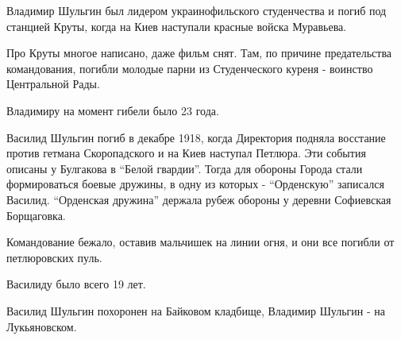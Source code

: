 
Владимир Шульгин был лидером украинофильского студенчества и погиб под станцией
Круты, когда на Киев наступали красные войска Муравьева.

Про Круты многое написано, даже фильм снят. Там, по причине предательства
командования, погибли молодые парни из Студенческого куреня - воинство
Центральной Рады.

Владимиру на момент гибели было 23 года.


Василид Шульгин погиб в декабре 1918, когда Директория подняла восстание против
гетмана Скоропадского и на Киев наступал Петлюра. Эти события описаны у
Булгакова в \enquote{Белой гвардии}. Тогда для обороны Города стали формироваться
боевые дружины, в одну из которых - \enquote{Орденскую} записался Василид. \enquote{Орденская
дружина} держала рубеж обороны у деревни Софиевская Борщаговка.

Командование бежало, оставив мальчишек на линии огня, и они все погибли от
петлюровских пуль.

Василиду было всего 19 лет.

Василид Шульгин похоронен на Байковом кладбище, Владимир Шульгин - на
Лукьяновском.

